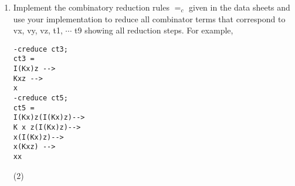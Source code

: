 \documentclass[11pt]{article}
\begin{document}
\begin{enumerate}
\begin{itemize}
\begin{verbatim}
- setterms ct6;
val it = [CS] : COM list

- setterms ct7;
val it = [CAPP (CAPP (CS,CI),CI),CAPP (CS,CI),CS,CI] : COM list

- setterms ct8;
val it = [CAPP (CAPP (CS,CI),CI),CAPP (CS,CI),CS,CI] : COM list

- setterms ct9;
val it =
  [CAPP (CAPP (CAPP (CS,CI),CI),CAPP (CAPP (CI,CAPP (CK,CID "x")),CID "z")),
   CAPP (CAPP (CS,CI),CI),CAPP (CS,CI),CS,CI,
   CAPP (CAPP (CI,CAPP (CK,CID "x")),CID "z"),CAPP (CI,CAPP (CK,CID "x")),
   CAPP (CK,CID "x"),CK,CID "x",CID "z"] : COM list

	      	      \end{verbatim}
	      	      \item
	      	      \large Printing the list nicely.
	      	      
	      	      \begin{verbatim}
- printlistcomb(ct1);
I''
val it = () : unit

- printlistcomb(ct2);
(K'' x)
K''
x
val it = () : unit

- printlistcomb(ct3);
((I'' (K'' x)) z)
(I'' (K'' x))
I''
(K'' x)
K''
x
z
val it = () : unit

- printlistcomb(ct4);
(I'' z)
I''
z
val it = () : unit

- printlistcomb(ct5);
(((I'' (K'' x)) z) ((I'' (K'' x)) z))
((I'' (K'' x)) z)
(I'' (K'' x))
I''
(K'' x)
K''
x
z
val it = () : unit

- printlistcomb(ct6);
S''
val it = () : unit

- printlistcomb(ct7);
((S'' I'') I'')
(S'' I'')
S''
I''
val it = () : unit

- printlistcomb(ct8);
((S'' I'') I'')
(S'' I'')
S''
I''
val it = () : unit

- printlistcomb(ct9);
(((S'' I'') I'') ((I'' (K'' x)) z))
((S'' I'') I'')
(S'' I'')
S''
I''
((I'' (K'' x)) z)
(I'' (K'' x))
(K'' x)
K''
x
z
val it = () : unit
	      	      \end{verbatim}
	      \end{itemize}
	      \color{black}
	\item
	      Implement the combinatory reduction rules $=_c$ given in the data sheets and use your implementation to reduce
	      all combinator terms that correspond to  vx, vy, vz, t1, $\cdots$ t9 showing all reduction steps.  
	      For example,
	      \begin{verbatim}
-creduce ct3;
ct3 =
I(Kx)z -->
Kxz -->
x
-creduce ct5;
ct5 =
I(Kx)z(I(Kx)z)-->
K x z(I(Kx)z)-->
x(I(Kx)z)-->
x(Kxz) -->
xx
	      \end{verbatim}
	      \hfill{(2)} %
	      

\end{enumerate}
\end{document}
